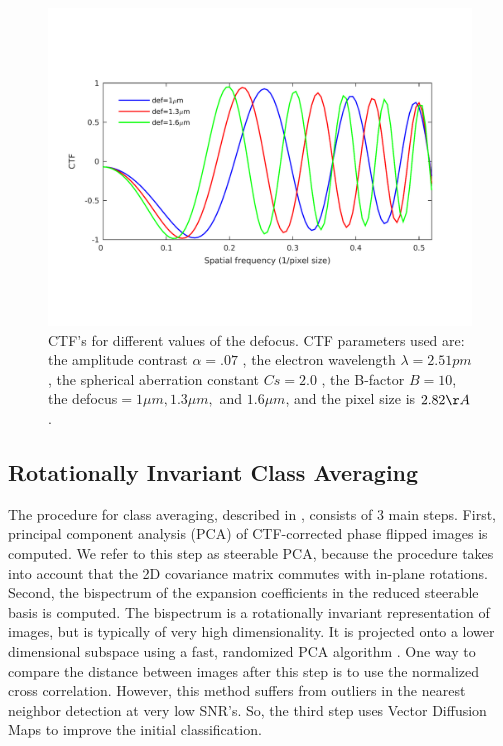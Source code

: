 \documentclass{article}
\begin{document}
\begin{figure}
\begin{center}
\includegraphics[scale=0.4]{ctfeg_fig.png}
\caption{CTF's for different values of the defocus. CTF parameters used are: the amplitude contrast $\alpha = .07$
, the electron wavelength $\lambda= 2.51pm$, the spherical aberration constant $Cs=2.0$
, the B-factor $B=10$, the defocus$=1\mu m, 1.3\mu m,$ and
$1.6\mu m$, and the pixel size is $2.82\AA$.
}\label{fig:ctf}
\end{center}

\end{figure}


\subsection{Rotationally Invariant Class Averaging}
The procedure for class averaging, described in \cite{zhao}, consists of 3 main steps. First, principal component analysis (PCA) of CTF-corrected phase flipped images is computed. We refer to this step as steerable PCA, because the procedure takes into account that the 2D covariance matrix commutes with in-plane rotations. Second, the bispectrum of the expansion coefficients in the reduced steerable basis is computed. The bispectrum is a rotationally invariant representation of images, but is typically of very high dimensionality. It is projected onto a lower dimensional subspace using a fast, randomized PCA algorithm \cite{rokhlin}. One way to compare the distance between images after this step is to use the normalized cross correlation. However, this method suffers from outliers in the nearest neighbor detection at very low SNR's. So, the third step uses Vector Diffusion Maps\cite{vdm} to improve the initial classification.
\end{document}
